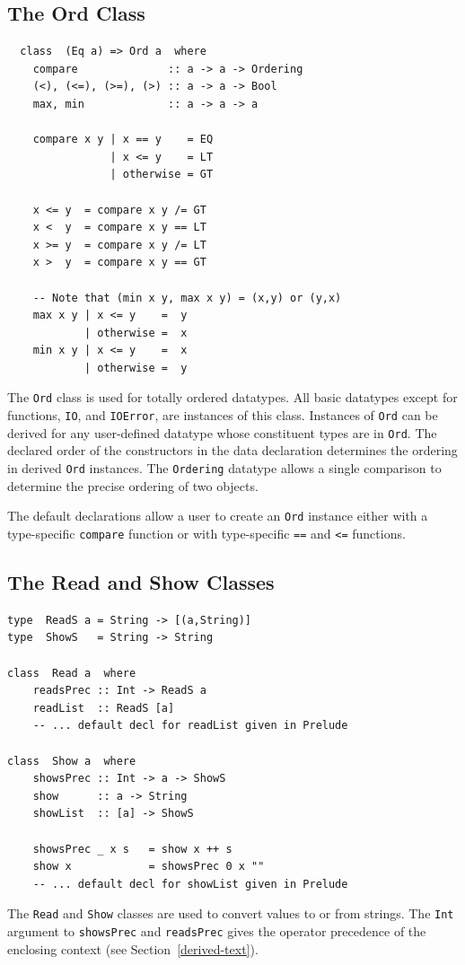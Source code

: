 \subsection{The Ord Class}
\indextt{<}
\indextt{<=}
\indextt{>}
\indextt{>=}
\bprog
{\small\begin{verbatim}
  class  (Eq a) => Ord a  where
    compare              :: a -> a -> Ordering
    (<), (<=), (>=), (>) :: a -> a -> Bool
    max, min             :: a -> a -> a

    compare x y | x == y    = EQ
                | x <= y    = LT
                | otherwise = GT

    x <= y  = compare x y /= GT
    x <  y  = compare x y == LT
    x >= y  = compare x y /= LT
    x >  y  = compare x y == GT

    -- Note that (min x y, max x y) = (x,y) or (y,x)
    max x y | x <= y    =  y
            | otherwise =  x
    min x y | x <= y    =  x
            | otherwise =  y
\end{verbatim}}
\eprog
The \mbox{\tt Ord} class is used for totally ordered datatypes.  All basic
datatypes
except for functions, \mbox{\tt IO}, and \mbox{\tt IOError}, are instances of this class.  Instances
of \mbox{\tt Ord} 
can be derived for any user-defined datatype whose constituent types
are in \mbox{\tt Ord}.  The declared order
of the constructors in the data declaration determines the ordering in
derived \mbox{\tt Ord} instances.
The \mbox{\tt Ordering} datatype
allows a single comparison to determine the precise ordering of two
objects.

The default declarations allow a user to create an \mbox{\tt Ord} instance 
either with a type-specific \mbox{\tt compare} function or with type-specific
\mbox{\tt ==} and \mbox{\tt <=} functions.

\subsection{The Read and Show Classes}
\bprog
{\small\begin{verbatim}
type  ReadS a = String -> [(a,String)]
type  ShowS   = String -> String

class  Read a  where
    readsPrec :: Int -> ReadS a
    readList  :: ReadS [a]
    -- ... default decl for readList given in Prelude

class  Show a  where
    showsPrec :: Int -> a -> ShowS
    show      :: a -> String 
    showList  :: [a] -> ShowS

    showsPrec _ x s   = show x ++ s
    show x            = showsPrec 0 x ""
    -- ... default decl for showList given in Prelude
\end{verbatim}}
\eprog
The \mbox{\tt Read} and \mbox{\tt Show} classes are used to convert values to
or from strings. 
The \mbox{\tt Int} argument to \mbox{\tt showsPrec} and \mbox{\tt readsPrec} gives the operator
precedence of the enclosing context (see Section~\ref{derived-text}).

